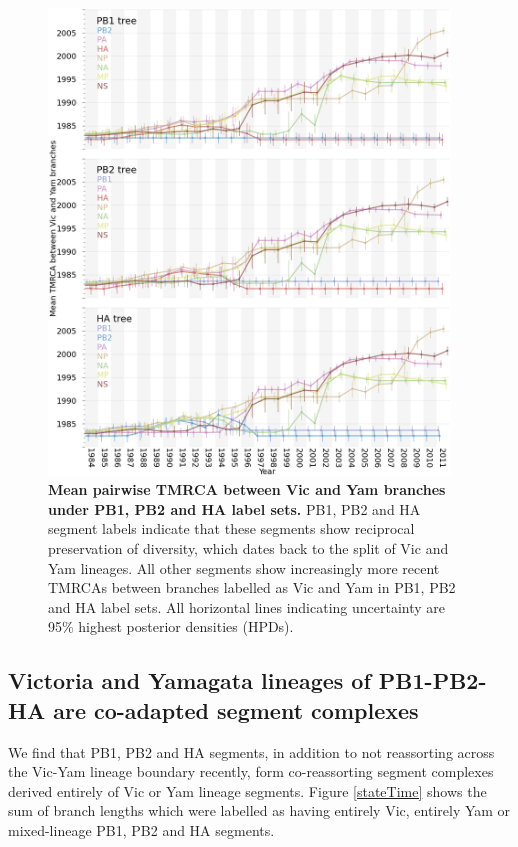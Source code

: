 \documentclass[11pt,oneside,letterpaper]{article}
\begin{document}
\begin{figure}
	\centering		
	\includegraphics[width=0.95\textwidth]{figures/InfB_betweenDiversity.png}
	\caption{\textbf{Mean pairwise TMRCA between Vic and Yam branches under PB1, PB2 and HA label sets.}
PB1, PB2 and HA segment labels indicate that these segments show reciprocal preservation of diversity, which dates back to the split of Vic and Yam lineages.
All other segments show increasingly more recent TMRCAs between branches labelled as Vic and Yam in PB1, PB2 and HA label sets.
All horizontal lines indicating uncertainty are 95\% highest posterior densities (HPDs).}
	\label{betweenDiversity}
\end{figure}

\subsection*{Victoria and Yamagata lineages of PB1-PB2-HA are co-adapted segment complexes}
We find that PB1, PB2 and HA segments, in addition to not reassorting across the Vic-Yam lineage boundary recently, form co-reassorting segment complexes derived entirely of Vic or Yam lineage segments.
Figure \ref{stateTime} shows the sum of branch lengths which were labelled as having entirely Vic, entirely Yam or mixed-lineage PB1, PB2 and HA segments.
\end{document}
